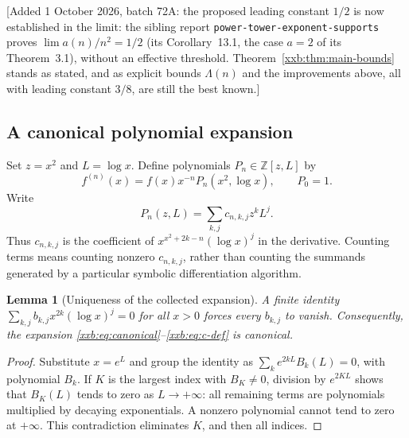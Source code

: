 \documentclass[11pt,a4paper]{article}
\numberwithin{equation}{section}
\newtheorem{lemma}[theorem]{Lemma}
\theoremstyle{definition}
\theoremstyle{remark}
\theoremstyle{plain}
\newcommand{\Z}{\mathbb Z}
\newcommand{\sibPTE}{\texttt{power-\allowbreak{}tower-\allowbreak{}exponent-\allowbreak{}supports}}
\begin{document}
[Added 1 October 2026, batch 72A: the proposed leading constant $1/2$ is now established
in the limit: the sibling report \sibPTE{} proves $\lim a(n)/n^2=1/2$
(its Corollary~13.1, the case $a=2$ of its Theorem~3.1), without an effective
threshold.  Theorem~\ref{xxb:thm:main-bounds} stands as stated, and as explicit
bounds $\Lambda(n)$ and the improvements above, all with leading constant $3/8$,
are still the best known.]

\subsection{A canonical polynomial expansion}\label{xxb:sec:canonical}
Set $z=x^2$ and $L=\log x$. Define polynomials $P_n\in\Z[z,L]$ by
\begin{equation}\label{xxb:eq:canonical}
 f^{(n)}(x)=f(x)x^{-n}P_n(x^2,\log x),\qquad P_0=1.
\end{equation}
Write
\begin{equation}\label{xxb:eq:c-def}
 P_n(z,L)=\sum_{k,j}c_{n,k,j}z^kL^j.
\end{equation}
Thus $c_{n,k,j}$ is the coefficient of
$x^{x^2+2k-n}(\log x)^j$ in the derivative. Counting terms means counting
nonzero $c_{n,k,j}$, rather than counting the summands generated by a
particular symbolic differentiation algorithm.

\begin{lemma}[Uniqueness of the collected expansion]\label{xxb:lem:unique}
A finite identity $\sum_{k,j}b_{k,j}x^{2k}(\log x)^j=0$ for all $x>0$
forces every $b_{k,j}$ to vanish. Consequently, the expansion
\eqref{xxb:eq:canonical}--\eqref{xxb:eq:c-def} is canonical.
\end{lemma}
\begin{proof}
Substitute $x=e^L$ and group the identity as
$\sum_k e^{2kL}B_k(L)=0$, with polynomial $B_k$. If $K$ is the largest
index with $B_K\ne0$, division by $e^{2KL}$ shows that $B_K(L)$ tends to
zero as $L\to+\infty$: all remaining terms are polynomials multiplied by
decaying exponentials. A nonzero polynomial cannot tend to zero at
$+\infty$. This contradiction eliminates $K$, and then all indices.
\end{proof}
\end{document}
